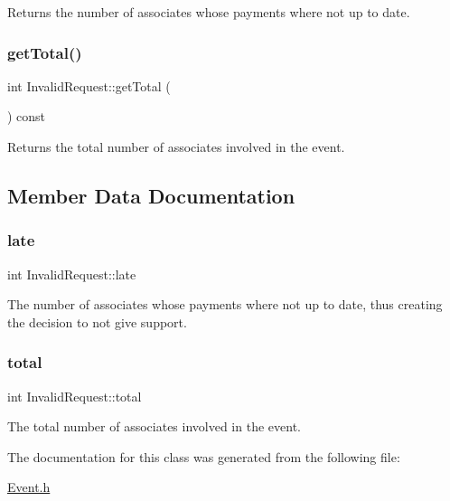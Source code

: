 Returns the number of associates whose payments where not up to date. 

\mbox{\label{classInvalidRequest_aab3f76dbf45d395e92622d1eb6d69948}} 
\subsubsection{\texorpdfstring{get\+Total()}{getTotal()}}
{\footnotesize\ttfamily int Invalid\+Request\+::get\+Total (\begin{DoxyParamCaption}{ }\end{DoxyParamCaption}) const\hspace{0.3cm}{\ttfamily [inline]}}



Returns the total number of associates involved in the event. 



\subsection{Member Data Documentation}
\mbox{\label{classInvalidRequest_a658c907cf50b5f171ec30bcb40cae2e9}} 
\subsubsection{\texorpdfstring{late}{late}}
{\footnotesize\ttfamily int Invalid\+Request\+::late\hspace{0.3cm}{\ttfamily [private]}}



The number of associates whose payments where not up to date, thus creating the decision to not give support. 

\mbox{\label{classInvalidRequest_aaf6dbebd550f136ce6a4c908a8c2d9b8}} 
\subsubsection{\texorpdfstring{total}{total}}
{\footnotesize\ttfamily int Invalid\+Request\+::total\hspace{0.3cm}{\ttfamily [private]}}



The total number of associates involved in the event. 



The documentation for this class was generated from the following file\+:\begin{DoxyCompactItemize}
\item 
\mbox{\hyperlink{Event_8h}{Event.\+h}}\end{DoxyCompactItemize}
